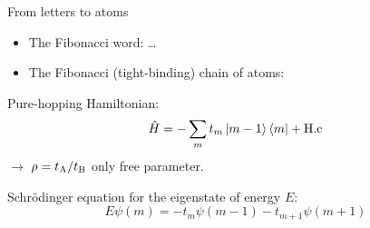 \begin{frame}{From letters to atoms}
\begin{itemize}
	\item The Fibonacci word:
	\ca\cb\ca\ca\cb\ca\cb\ca\dots
	
	\item The Fibonacci (tight-binding) chain of atoms:
	
	{\centering
	}

\end{itemize}
Pure-hopping Hamiltonian:
\[
	\hat{H} = - \sum_m t_m \ket{m-1} \bra{m} + \text{H.c}
\]
$\to$ $\rho = t_{\text{A}}/t_{\text{B}}$ only free parameter.

Schrödinger equation for the eigenstate of energy $E$:
\[
	E \psi(m) = -t_{m}\psi(m-1) -t_{m+1}\psi(m+1)
\]
\end{frame}

